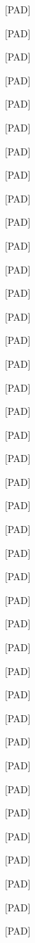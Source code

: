 \documentclass[varwidth=150mm]{standalone}
\begin{document}
\begin{CJK*}{UTF8}{gbsn}
{{{\colorbox{red!0.0}{\strut [PAD]} \colorbox{red!0.0}{\strut [PAD]} \colorbox{red!0.0}{\strut [PAD]} \colorbox{red!0.0}{\strut [PAD]} \colorbox{red!0.0}{\strut [PAD]} \colorbox{red!0.0}{\strut [PAD]} \colorbox{red!0.0}{\strut [PAD]} \colorbox{red!0.0}{\strut [PAD]} \colorbox{red!0.0}{\strut [PAD]} \colorbox{red!0.0}{\strut [PAD]} \colorbox{red!0.0}{\strut [PAD]} \colorbox{red!0.0}{\strut [PAD]} \colorbox{red!0.0}{\strut [PAD]} \colorbox{red!0.0}{\strut [PAD]} \colorbox{red!0.0}{\strut [PAD]} \colorbox{red!0.0}{\strut [PAD]} \colorbox{red!0.0}{\strut [PAD]} \colorbox{red!0.0}{\strut [PAD]} \colorbox{red!0.0}{\strut [PAD]} \colorbox{red!0.0}{\strut [PAD]} \colorbox{red!0.0}{\strut [PAD]} \colorbox{red!0.0}{\strut [PAD]} \colorbox{red!0.0}{\strut [PAD]} \colorbox{red!0.0}{\strut [PAD]} \colorbox{red!0.0}{\strut [PAD]} \colorbox{red!0.0}{\strut [PAD]} \colorbox{red!0.0}{\strut [PAD]} \colorbox{red!0.0}{\strut [PAD]} \colorbox{red!0.0}{\strut [PAD]} \colorbox{red!0.0}{\strut [PAD]} \colorbox{red!0.0}{\strut [PAD]} \colorbox{red!0.0}{\strut [PAD]} \colorbox{red!0.0}{\strut [PAD]} \colorbox{red!0.0}{\strut [PAD]} \colorbox{red!0.0}{\strut [PAD]} \colorbox{red!0.0}{\strut [PAD]} \colorbox{red!0.0}{\strut [PAD]} \colorbox{red!0.0}{\strut [PAD]} \colorbox{red!0.0}{\strut [PAD]} \colorbox{red!0.0}{\strut [PAD]}
}}}
\end{CJK*}
\end{document}
